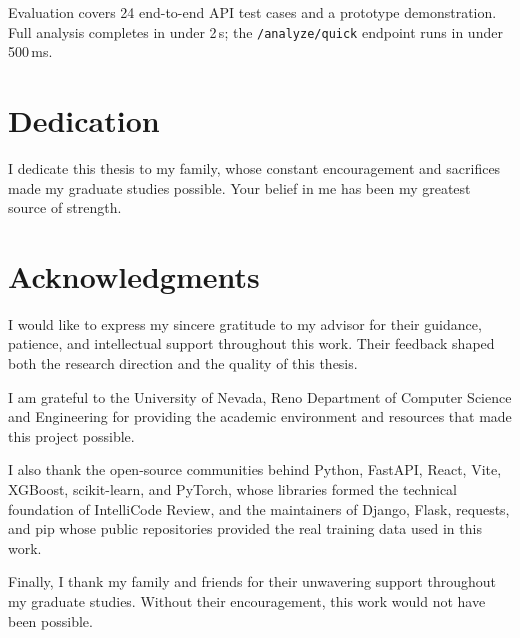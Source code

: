 \documentclass[12pt, oneside]{report}
\begin{document}
Evaluation covers 24 end-to-end API test cases and a prototype demonstration. Full analysis
completes in under 2\,s; the \texttt{/analyze/quick} endpoint runs in under 500\,ms.

\chapter*{Dedication}

I dedicate this thesis to my family, whose constant encouragement and sacrifices made my
graduate studies possible. Your belief in me has been my greatest source of strength.

\chapter*{Acknowledgments}

I would like to express my sincere gratitude to my advisor for their guidance, patience, and
intellectual support throughout this work. Their feedback shaped both the research direction
and the quality of this thesis.

I am grateful to the University of Nevada, Reno Department of Computer Science and
Engineering for providing the academic environment and resources that made this project
possible.

I also thank the open-source communities behind Python, FastAPI, React, Vite, XGBoost,
scikit-learn, and PyTorch, whose libraries formed the technical foundation of IntelliCode
Review, and the maintainers of Django, Flask, requests, and pip whose public repositories
provided the real training data used in this work.

Finally, I thank my family and friends for their unwavering support throughout my graduate
studies. Without their encouragement, this work would not have been possible.

\tableofcontents
\listoftables
\listoffigures

\end{document}
